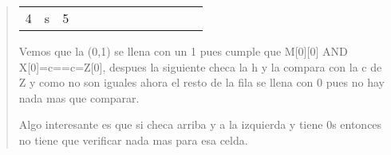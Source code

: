 \begin{quote}
\begin{table}[H]
\begin{tabular}{lllllllllllll}
          4 & s & \multicolumn{1}{l|}{5} & \multicolumn{1}{l|}{}  & \multicolumn{1}{l|}{}  & \multicolumn{1}{l|}{}  & \multicolumn{1}{l|}{}  & \multicolumn{1}{l|}{}  & \multicolumn{1}{l|}{}  & \multicolumn{1}{l|}{}  & \multicolumn{1}{l|}{}  & \multicolumn{1}{l|}{}  & \multicolumn{1}{l|}{}  \\ \cline{4-13} 
          \end{tabular}
    \end{table}

    Vemos que la (0,1) se llena con un 1 pues cumple que M[0][0] AND X[0]=c==c=Z[0], despues la siguiente checa la h y la compara con la c de Z y como no son iguales ahora el resto de la fila se llena con 0 pues no hay nada mas que comparar. \vspace{.2cm}

    Algo interesante es que si checa arriba y a la izquierda y tiene 0s entonces no tiene que verificar nada mas para esa celda. \vspace{.2cm}


\end{quote}
